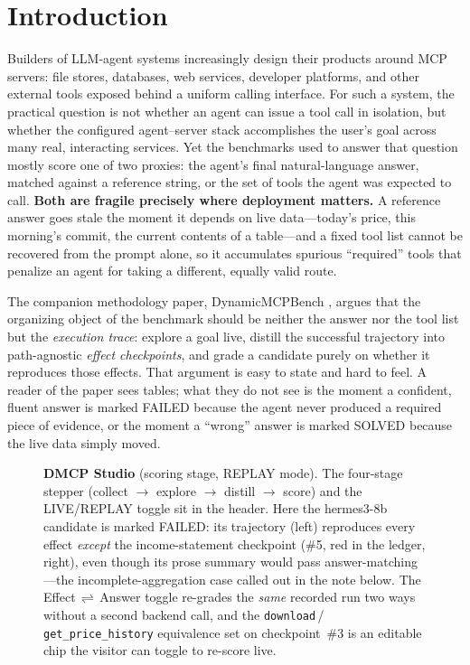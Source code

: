 \section{Introduction}
\label{sec:intro}

Builders of LLM-agent systems increasingly design their products around MCP
servers: file stores, databases, web services, developer platforms, and other
external tools exposed behind a uniform calling interface. For such a system,
the practical question is not whether an agent can issue a tool call in
isolation, but whether the configured agent--server stack accomplishes the
user's goal across many real, interacting services. Yet the benchmarks used to
answer that question mostly score one of two proxies: the agent's final
natural-language answer, matched against a reference string, or the set of
tools the agent was expected to call. \textbf{Both are fragile precisely where
deployment matters.} A reference answer goes stale the moment it depends on
live data---today's price, this morning's commit, the current contents of a
table---and a fixed tool list cannot be recovered from the prompt alone, so it
accumulates spurious ``required'' tools that penalize an agent for taking a
different, equally valid route.

The companion methodology paper, DynamicMCPBench
\citep{dynamicmcpbench2026}, argues that the organizing object of the
benchmark should be neither the answer nor the tool list but the
\emph{execution trace}: explore a goal live, distill the successful
trajectory into path-agnostic \emph{effect checkpoints}, and grade a
candidate purely on whether it reproduces those effects. That argument is
easy to state and hard to feel. A reader of the paper sees tables; what they
do not see is the moment a confident, fluent answer is marked
\textsf{FAILED} because the agent never produced a required piece of
evidence, or the moment a ``wrong'' answer is marked \textsf{SOLVED} because
the live data simply moved.

\begin{figure}[tbp]
  \centering
  
  \caption{\textbf{DMCP Studio} (scoring stage, REPLAY mode). The four-stage
    stepper (collect $\rightarrow$ explore $\rightarrow$ distill $\rightarrow$
    score) and the LIVE/REPLAY toggle sit in the header. Here the
    \textsf{hermes3-8b} candidate is marked \textsf{FAILED}: its trajectory
    (left) reproduces every effect \emph{except} the income-statement
    checkpoint (\#5, red in the ledger, right), even though its prose summary
    would pass answer-matching---the incomplete-aggregation case called out in
    the note below. The Effect\,$\rightleftharpoons$\,Answer toggle re-grades
    the \emph{same} recorded run two ways without a second backend call, and the
    \texttt{download}\,/\,\texttt{get\_price\_history} equivalence set on
    checkpoint~\#3 is an editable chip the visitor can toggle to re-score live.}
  \label{fig:studio}
\end{figure}

